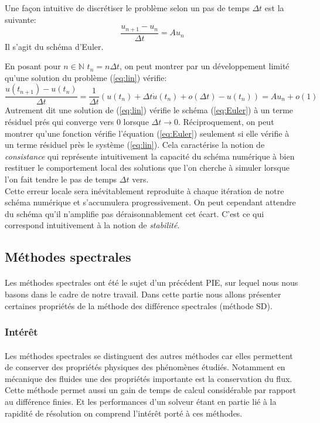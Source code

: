 Une façon intuitive de discrétiser le problème selon un pas de temps $\Delta t$ est la suivante:
\begin{equation}
    \frac{u_{n+1}-u_n}{\Delta t} = A u_n 
    \label{eq:Euler}
\end{equation}
Il s'agit du schéma d'Euler.

En posant pour $n\in \mathbb{N}$ $t_n = n \Delta t$, on peut montrer par un développement limité qu'une solution du problème (\ref{eq:lin}) vérifie:
$$
\frac{u(t_{n+1}) -u(t_n)}{\Delta t} = \frac{1}{\Delta t}\left(u(t_n) + \Delta t \dot{u}(t_n) +o(\Delta t) - u(t_n)\right) = Au_n +o(1)
$$
Autrement dit une solution de (\ref{eq:lin}) vérifie le schéma (\ref{eq:Euler}) à un terme résiduel prés qui converge vers 0 lorsque $\Delta t \rightarrow 0$. Réciproquement, on peut montrer qu'une fonction vérifie l'équation (\ref{eq:Euler}) seulement si elle vérifie à un terme résiduel près le système (\ref{eq:lin}). Cela caractérise la notion de \emph{consistance} qui représente intuitivement la capacité du schéma numérique à bien restituer le comportement local des solutions que l'on cherche à simuler lorsque l'on fait tendre le pas de temps $\Delta t$ vers.\\

Cette erreur locale sera inévitablement reproduite à chaque itération de notre schéma numérique et s'accumulera progressivement. On peut cependant attendre du schéma qu'il n'amplifie pas déraisonnablement cet écart. C'est ce qui correspond intuitivement à la notion de \emph{stabilité}.  
\subsection{Méthodes spectrales}

\paragraph{}
Les méthodes spectrales ont été le sujet d'un précédent PIE, sur lequel nous nous basons dans le cadre de notre travail. Dans cette partie nous allons présenter certaines propriétés de la méthode des différence spectrales (méthode SD).

    \subsubsection{Intérêt}
    \paragraph{}
    Les méthodes spectrales se distinguent des autres méthodes car elles permettent de conserver des propriétés physiques des phénomènes étudiés. Notamment en mécanique des fluides une des propriétés importante est la conservation du flux. Cette méthode permet aussi un gain de temps de calcul considérable par rapport au différence finies. Et les performances d'un solveur étant en partie lié à la rapidité de résolution on comprend l'intérêt porté à ces méthodes.
